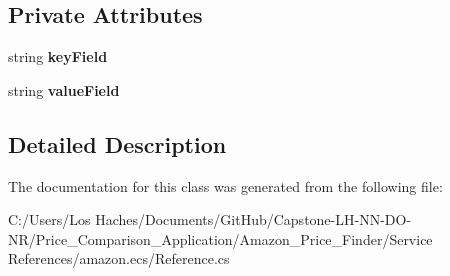 \subsection*{Private Attributes}
\begin{DoxyCompactItemize}
\item 
\hypertarget{class_price___comparison_1_1amazon_1_1ecs_1_1_cart_item_key_value_pair_a6eb3ef6b2db924bc4b7914303b837a04}{string {\bfseries key\-Field}}\label{class_price___comparison_1_1amazon_1_1ecs_1_1_cart_item_key_value_pair_a6eb3ef6b2db924bc4b7914303b837a04}

\item 
\hypertarget{class_price___comparison_1_1amazon_1_1ecs_1_1_cart_item_key_value_pair_a2aec7e93cfbdcc741d67a21d81cfb266}{string {\bfseries value\-Field}}\label{class_price___comparison_1_1amazon_1_1ecs_1_1_cart_item_key_value_pair_a2aec7e93cfbdcc741d67a21d81cfb266}

\end{DoxyCompactItemize}


\subsection{Detailed Description}


The documentation for this class was generated from the following file\-:\begin{DoxyCompactItemize}
\item 
C\-:/\-Users/\-Los Haches/\-Documents/\-Git\-Hub/\-Capstone-\/\-L\-H-\/\-N\-N-\/\-D\-O-\/\-N\-R/\-Price\-\_\-\-Comparison\-\_\-\-Application/\-Amazon\-\_\-\-Price\-\_\-\-Finder/\-Service References/amazon.\-ecs/Reference.\-cs\end{DoxyCompactItemize}
